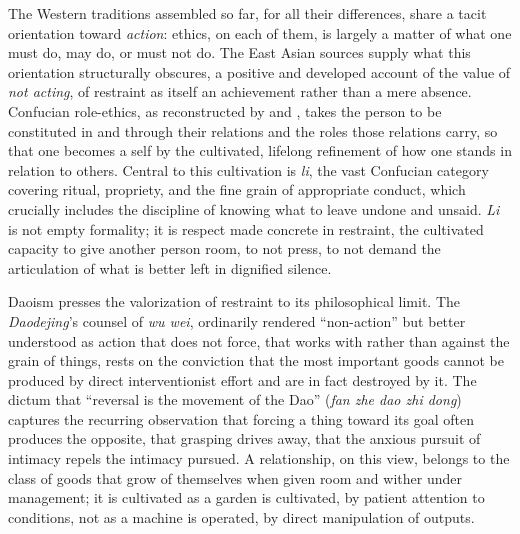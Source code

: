 The Western traditions assembled so far, for all their differences, share a tacit orientation toward \emph{action}: ethics, on each of them, is largely a matter of what one must do, may do, or must not do. The East Asian sources supply what this orientation structurally obscures, a positive and developed account of the value of \emph{not acting}, of restraint as itself an achievement rather than a mere absence. Confucian role-ethics, as reconstructed by \textcite{ames2011confucian} and \textcite{tu1985confucian}, takes the person to be constituted in and through their relations and the roles those relations carry, so that one becomes a self by the cultivated, lifelong refinement of how one stands in relation to others. Central to this cultivation is \emph{li}, the vast Confucian category covering ritual, propriety, and the fine grain of appropriate conduct, which crucially includes the discipline of knowing what to leave undone and unsaid. \emph{Li} is not empty formality; it is respect made concrete in restraint, the cultivated capacity to give another person room, to not press, to not demand the articulation of what is better left in dignified silence.

Daoism presses the valorization of restraint to its philosophical limit. The \emph{Daodejing}'s counsel of \emph{wu wei}, ordinarily rendered ``non-action'' but better understood as action that does not force, that works with rather than against the grain of things, rests on the conviction that the most important goods cannot be produced by direct interventionist effort and are in fact destroyed by it. The dictum that ``reversal is the movement of the Dao'' (\emph{fan zhe dao zhi dong}) captures the recurring observation that forcing a thing toward its goal often produces the opposite, that grasping drives away, that the anxious pursuit of intimacy repels the intimacy pursued. A relationship, on this view, belongs to the class of goods that grow of themselves when given room and wither under management; it is cultivated as a garden is cultivated, by patient attention to conditions, not as a machine is operated, by direct manipulation of outputs.

